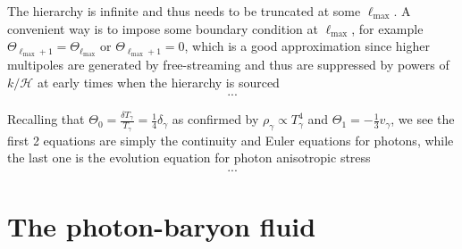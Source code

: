 The hierarchy is infinite and thus needs to be truncated at some $\ell_\text{max}$.
A convenient way is to impose some boundary condition at $\ell_\text{max}$, for example $\Theta_{\ell_\text{max}+1} = \Theta_{\ell_\text{max}}$ or $\Theta_{\ell_\text{max}+1} = 0$, which is a good approximation since higher multipoles are generated by free-streaming and thus are suppressed by powers of $k/\mathcal{H}$ at early times when the hierarchy is sourced
\begin{align}
    ...
\end{align}



Recalling that $\Theta_0= \frac{\delta T_\gamma}{T_\gamma}= \tfrac14 \delta_\gamma$ as confirmed by $\rho_\gamma \propto T_\gamma^4$ and $\Theta_1 = -\tfrac13 v_\gamma$, we see the first 2 equations are simply the continuity and Euler equations for photons, while the last one is the evolution equation for photon anisotropic stress
\begin{align}
    ...
\end{align}





\section{The photon-baryon fluid}

